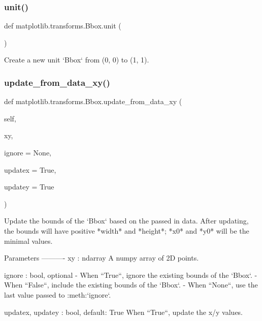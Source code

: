 \subsubsection{\texorpdfstring{unit()}{unit()}}
{\footnotesize\ttfamily def matplotlib.\+transforms.\+Bbox.\+unit (\begin{DoxyParamCaption}{ }\end{DoxyParamCaption})\hspace{0.3cm}{\ttfamily [static]}}

\begin{DoxyVerb}Create a new unit `Bbox` from (0, 0) to (1, 1).\end{DoxyVerb}
 \mbox{\label{classmatplotlib_1_1transforms_1_1Bbox_a14c151102e281f7c5c7ca8c586ff7629}} 
\subsubsection{\texorpdfstring{update\+\_\+from\+\_\+data\+\_\+xy()}{update\_from\_data\_xy()}}
{\footnotesize\ttfamily def matplotlib.\+transforms.\+Bbox.\+update\+\_\+from\+\_\+data\+\_\+xy (\begin{DoxyParamCaption}\item[{}]{self,  }\item[{}]{xy,  }\item[{}]{ignore = {\ttfamily None},  }\item[{}]{updatex = {\ttfamily True},  }\item[{}]{updatey = {\ttfamily True} }\end{DoxyParamCaption})}

\begin{DoxyVerb}Update the bounds of the `Bbox` based on the passed in
data.  After updating, the bounds will have positive *width*
and *height*; *x0* and *y0* will be the minimal values.

Parameters
----------
xy : ndarray
    A numpy array of 2D points.

ignore : bool, optional
   - When ``True``, ignore the existing bounds of the `Bbox`.
   - When ``False``, include the existing bounds of the `Bbox`.
   - When ``None``, use the last value passed to :meth:`ignore`.

updatex, updatey : bool, default: True
    When ``True``, update the x/y values.
\end{DoxyVerb}
 \mbox{\label{classmatplotlib_1_1transforms_1_1Bbox_af6614dedf5efd2a66d2b8c5e63126736}} 
